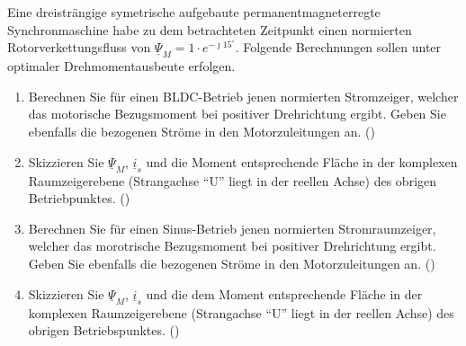 \begin{question}[section=1,name={24.6.2013},mode=exm,type=bsp,tags={20130624}]
Eine dreisträngige symetrische aufgebaute permanentmagneterregte Synchronmaschine habe zu dem betrachteten Zeitpunkt einen normierten Rotorverkettungsfluss von $\underline{\Psi}_M = 1 \cdot e^{-\jmath15^\circ}$. Folgende Berechnungen sollen unter optimaler Drehmomentausbeute erfolgen.
\begin{enumerate}
\item Berechnen Sie für einen BLDC-Betrieb jenen normierten Stromzeiger, welcher das motorische Bezugsmoment bei positiver Drehrichtung ergibt. Geben Sie ebenfalls die bezogenen Ströme in den Motorzuleitungen an. ()
\item Skizzieren Sie $\underline{\Psi}_M$, $\underline{i}_s$ und die Moment entsprechende Fläche in der komplexen Raumzeigerebene (Strangachse ``U'' liegt in der reellen Achse) des obrigen Betriebpunktes. ()
\item Berechnen Sie für einen Sinus-Betrieb jenen normierten Stromraumzeiger, welcher das morotrische Bezugsmoment bei positiver Drehrichtung ergibt. Geben Sie ebenfalls die bezogenen Ströme in den Motorzuleitungen an. ()
\item Skizzieren Sie $\underline{\Psi}_M$, $\underline{i}_s$ und die dem Moment entsprechende Fläche in der komplexen Raumzeigerebene (Strangachse ``U'' liegt in der reellen Achse) des obrigen Betriebspunktes. ()
\end{enumerate}
\end{question}
